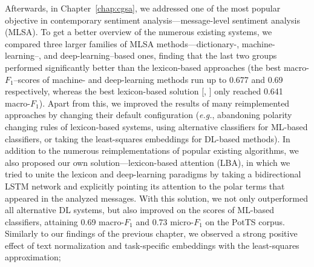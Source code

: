 \documentclass[11pt]{article}
\newcommand{\eg}{\textit{e.g.},}
\newcommand{\F}[0]{$F_1$}
\begin{document}
Afterwards, in Chapter~\ref{chap:cgsa}, we addressed one of the most
popular objective in contemporary sentiment analysis---message-level
sentiment analysis (MLSA).  To get a better overview of the numerous
existing systems, we compared three larger families of MLSA
methods---dictionary-, machine-learning--, and deep-learning--based
ones, finding that the last two groups performed significantly better
than the lexicon-based approaches (the best macro-\F{}--scores of
machine- and deep-learning methods run up to 0.677 and 0.69
respectively, whereas the best lexicon-based solution
[\citeauthor{Hu:04}, \citeyear{Hu:04}] only reached 0.641 macro-\F{}).
Apart from this, we improved the results of many reimplemented
approaches by changing their default configuration (\eg{} abandoning
polarity changing rules of lexicon-based systems, using alternative
classifiers for ML-based classifiers, or taking the least-squares
embeddings for DL-based methods).  In addition to the numerous
reimplementations of popular existing algorithms, we also proposed our
own solution---lexicon-based attention (LBA), in which we tried to
unite the lexicon and deep-learning paradigms by taking a
bidirectional LSTM network and explicitly pointing its attention to
the polar terms that appeared in the analyzed messages.  With this
solution, we not only outperformed all alternative DL systems, but
also improved on the scores of ML-based classifiers, attaining 0.69
macro-\F{} and 0.73 micro-\F{} on the PotTS corpus.  Similarly to our
findings of the previous chapter, we observed a strong positive effect
of text normalization and task-specific embeddings with the
least-squares approximation;
\end{document}
